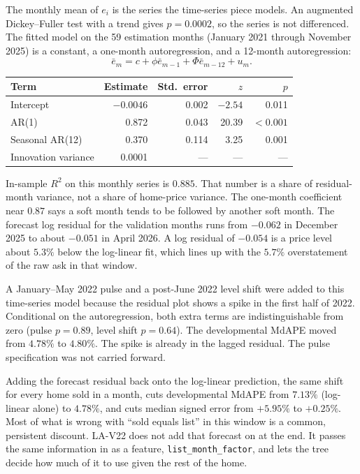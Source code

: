 \documentclass[11pt]{article}
\newcommand{\modelid}{LA-V22}
\begin{document}
The monthly mean of \(e_i\) is the series the time-series piece models. An augmented Dickey--Fuller test with a trend gives \(p = 0.0002\), so the series is not differenced. The fitted model on the 59 estimation months (January 2021 through November 2025) is a constant, a one-month autoregression, and a 12-month autoregression:
\[
\bar e_m = c + \phi \bar e_{m-1} + \Phi \bar e_{m-12} + u_m.
\]

\begin{center}
\begin{tabular}{lrrrr}
\toprule
Term & Estimate & Std.\ error & \(z\) & \(p\) \\
\midrule
Intercept & \(-0.0046\) & 0.002 & \(-2.54\) & 0.011 \\
AR(1) & 0.872 & 0.043 & 20.39 & \(<0.001\) \\
Seasonal AR(12) & 0.370 & 0.114 & 3.25 & 0.001 \\
Innovation variance & 0.0001 & --- & --- & --- \\
\bottomrule
\end{tabular}
\end{center}

In-sample \(R^2\) on this monthly series is \(0.885\). That number is a share of residual-month variance, not a share of home-price variance. The one-month coefficient near \(0.87\) says a soft month tends to be followed by another soft month. The forecast log residual for the validation months runs from \(-0.062\) in December 2025 to about \(-0.051\) in April 2026. A log residual of \(-0.054\) is a price level about \(5.3\%\) below the log-linear fit, which lines up with the \(5.7\%\) overstatement of the raw ask in that window.

A January--May 2022 pulse and a post-June 2022 level shift were added to this time-series model because the residual plot shows a spike in the first half of 2022. Conditional on the autoregression, both extra terms are indistinguishable from zero (pulse \(p = 0.89\), level shift \(p = 0.64\)). The developmental MdAPE moved from \(4.78\%\) to \(4.80\%\). The spike is already in the lagged residual. The pulse specification was not carried forward.

Adding the forecast residual back onto the log-linear prediction, the same shift for every home sold in a month, cuts developmental MdAPE from \(7.13\%\) (log-linear alone) to \(4.78\%\), and cuts median signed error from \(+5.95\%\) to \(+0.25\%\). Most of what is wrong with ``sold equals list'' in this window is a common, persistent discount. \modelid{} does not add that forecast on at the end. It passes the same information in as a feature, \texttt{list\_month\_factor}, and lets the tree decide how much of it to use given the rest of the home.
\end{document}
